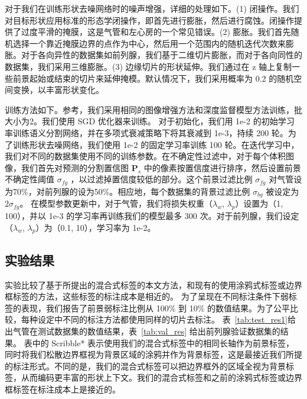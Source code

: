 对于我们在训练形状去噪网络时的噪声增强，详细的处理如下。(1) 闭操作。我们对目标形状应用标准的形态学闭操作，即首先进行膨胀，然后进行腐蚀。闭操作提供了过度平滑的掩膜，这是气管和左心房的一个常见错误。(2) 膨胀。我们首先随机选择一个靠近掩膜边界的点作为中心，然后用一个范围内的随机迭代次数来膨胀。对于各向异性的数据集如前列腺，我们基于二维切片膨胀，而对于各向同性的数据集，我们采用三维膨胀。(3) 边缘切片的形状延伸。我们通过在 z 轴上复制一些前景起始或结束的切片来延伸掩模。默认情况下，我们采用概率为 0.2 的随机空间变换，以丰富形状变化。

训练方法如下。参考\citet{isensee2019automated}，我们采用相同的图像增强方法和深度监督模型方法训练，批大小为2。我们使用 SGD 优化器来训练。
对于初始化，我们用 1e-2 的初始学习率训练语义分割网络，并在多项式衰减策略下将其衰减到 1e-3，持续 200 轮。为了训练形状去噪网络，我们使用 1e-2 的固定学习率训练 100 轮。在迭代学习中，我们对不同的数据集使用不同的训练参数。在不确定性过滤中，对于每个体积图像，我们首先对预测的分割置信图 $\mathbf{P}_s$ 中的像素按置信度进行排序，然后设置前景不确定性阈值 $\sigma_{fg}$ ，以过滤掉置信度较低的部分。这个前景过滤比例 $\sigma_{fg}$ 对气管设为70\%，对前列腺的设为50\%。相应地，每个数据集的背景过滤比例 $\sigma_{bg}$ 被设定为  $2\sigma_{fg}$。    %
在模型参数更新中，对于气管，我们将损失权重（$\lambda_w$, $\lambda_p$）设置为（1, 100），并以 1e-3 的学习率再训练我们的模型最多 300 次。对于前列腺，我们设定（$\lambda_w$, $\lambda_p$）为（0.1, 10），学习率为 1e-2。%


\subsection{实验结果} \label{sec:res1}

实验比较了基于所提出的混合式标签的本文方法，和现有的使用涂鸦式标签或边界框标签的方法，这些标签的标注成本是相近的。
为了呈现在不同标注条件下弱标签的表现，我们报告了前景弱标注比例从 100\% 到 10\% 的数值结果。为了公平比较，每种设定中不同的标注方法都使用同样的切片去标注。
表~\ref{tab:test_res1}给出气管在测试数据集的数值结果，表~\ref{tab:val_res} 给出前列腺验证数据集的结果。%
表中的 Scribble* 表示使用我们的混合式标签中的相同长轴作为前景标签，同时将我们松散边界框视为背景区域的涂鸦并作为背景标签，这是最接近我们所提的标注形式。不同的是，我们的混合式标签可以把边界框外的区域全视为背景标签，从而编码更丰富的形状上下文。我们的混合式标签和之前的涂鸦式标签或边界框标签在标注成本上是接近的。


